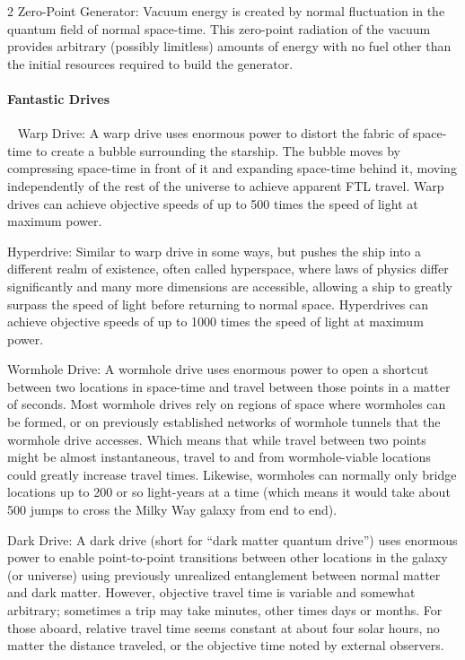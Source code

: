 \begin{multicols}{2}
Zero-Point Generator: Vacuum energy is created by normal fluctuation in the quantum field of normal space-time. This zero-point radiation of the vacuum provides arbitrary (possibly limitless) amounts of energy with no fuel other than the initial resources required to build the generator. 

\paragraph{Fantastic Drives}
 
Warp Drive: A warp drive uses enormous power to distort the fabric of space-time to create a bubble surrounding the starship. The bubble moves by compressing space-time in front of it and expanding space-time behind it, moving independently of the rest of the universe to achieve apparent FTL travel. Warp drives can achieve objective speeds of up to 500 times the speed of light at maximum power.

Hyperdrive: Similar to warp drive in some ways, but pushes the ship into a different realm of existence, often called hyperspace, where laws of physics differ significantly and many more dimensions are accessible, allowing a ship to greatly surpass the speed of light before returning to normal space. Hyperdrives can achieve objective speeds of up to 1000 times the speed of light at maximum power. 

Wormhole Drive: A wormhole drive uses enormous power to open a shortcut between two locations in space-time and travel between those points in a matter of seconds. Most wormhole drives rely on regions of space where wormholes can be formed, or on previously established networks of wormhole tunnels that the wormhole drive accesses. Which means that while travel between two points might be almost instantaneous, travel to and from wormhole-viable locations could greatly increase travel times. Likewise, wormholes can normally only bridge locations up to 200 or so light-years at a time (which means it would take about 500 jumps to cross the Milky Way galaxy from end to end). 

Dark Drive: A dark drive (short for “dark matter quantum drive”) uses enormous power to enable point-to-point transitions between other locations in the galaxy (or universe) using previously unrealized entanglement between normal matter and dark matter. However, objective travel time is variable and somewhat arbitrary; sometimes a trip may take minutes, other times days or months. For those aboard, relative travel time seems constant at about four solar hours, no matter the distance traveled, or the objective time noted by external observers.


\end{multicols}
